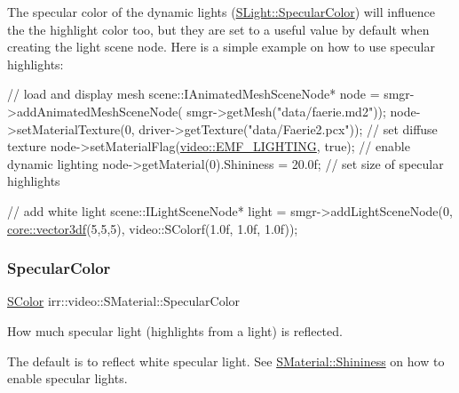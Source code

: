 The specular color of the dynamic lights (\hyperlink{structirr_1_1video_1_1SLight_a2d66ad28850a8588b2ba727103710604}{S\+Light\+::\+Specular\+Color}) will influence the the highlight color too, but they are set to a useful value by default when creating the light scene node. Here is a simple example on how to use specular highlights\+: 
\begin{DoxyCode}
\textcolor{comment}{// load and display mesh}
scene::IAnimatedMeshSceneNode* node = smgr->addAnimatedMeshSceneNode(
smgr->getMesh(\textcolor{stringliteral}{"data/faerie.md2"}));
node->setMaterialTexture(0, driver->getTexture(\textcolor{stringliteral}{"data/Faerie2.pcx"})); \textcolor{comment}{// set diffuse texture}
node->setMaterialFlag(\hyperlink{namespaceirr_1_1video_a8a3bc00ae8137535b9fbc5f40add70d3acea597a2692b8415486a464a7f954d34}{video::EMF\_LIGHTING}, \textcolor{keyword}{true}); \textcolor{comment}{// enable dynamic lighting}
node->getMaterial(0).Shininess = 20.0f; \textcolor{comment}{// set size of specular highlights}

\textcolor{comment}{// add white light}
scene::ILightSceneNode* light = smgr->addLightSceneNode(0,
    \hyperlink{namespaceirr_1_1core_a06f169d08b5c429f5575acb7edbad811}{core::vector3df}(5,5,5), video::SColorf(1.0f, 1.0f, 1.0f));
\end{DoxyCode}
 \mbox{\label{classirr_1_1video_1_1SMaterial_a253c2acbafe6698e3d16b3e3a1e199ed}} 
\subsubsection{\texorpdfstring{Specular\+Color}{SpecularColor}}
{\footnotesize\ttfamily \hyperlink{classirr_1_1video_1_1SColor}{S\+Color} irr\+::video\+::\+S\+Material\+::\+Specular\+Color}



How much specular light (highlights from a light) is reflected. 

The default is to reflect white specular light. See \hyperlink{classirr_1_1video_1_1SMaterial_a877106a83108db6d1f30a38379d28494}{S\+Material\+::\+Shininess} on how to enable specular lights. \mbox{\label{classirr_1_1video_1_1SMaterial_a98aab3128696d9ad3f0f516153f7bae0}} 
